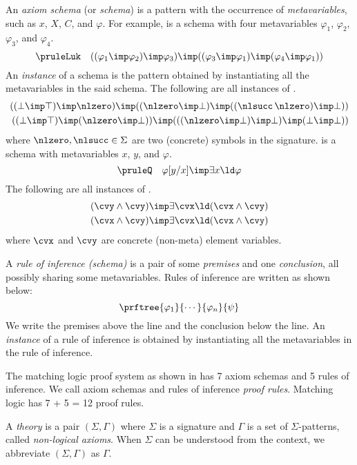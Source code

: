\documentclass{article}
\begin{document}
An \emph{axiom schema} (or \emph{schema}) is
a pattern with the occurrence of \emph{metavariables}, such as $x$, $X$, $C$, and $\varphi$.
For example,
\pruleLuk
is a schema with four metavariables
$\varphi_1$, $\varphi_2$, $\varphi_3$, and $\varphi_4$.
\[
\pruleLuk
\quad
((\varphi_1 \imp \varphi_2) \imp \varphi_3)
   \imp ((\varphi_3 \imp \varphi_1) \imp (\varphi_4 \imp \varphi_1))
\]
An \emph{instance} of a schema is the pattern obtained by
instantiating all the metavariables in the said schema.
The following are all instances of \pruleLuk.
\begin{align*}
((\bot \imp \top) \imp \nlzero)
   \imp ((\nlzero \imp \bot) \imp ((\nlsucc \, \nlzero) \imp \bot))
\\
((\bot \imp \top) \imp (\nlzero \imp \bot))
   \imp (((\nlzero \imp \bot) \imp \bot) \imp (\bot \imp \bot))
\end{align*}
where $\nlzero,\nlsucc \in \Sigma$ are two (concrete) symbols in the signature.
\pruleQ is a schema with metavariables $x$, $y$, and $\varphi$.
\[
\pruleQ \quad \varphi[y/x] \imp \exists x \ld \varphi
\]
The following are all instances of \pruleQ.
\begin{align*}
(\cvy \land \cvy) \imp \exists \cvx \ld (\cvx \land \cvy)
\\
(\cvx \land \cvy) \imp \exists \cvx \ld (\cvx \land \cvy)
\end{align*}
where $\cvx$ and $\cvy$ are concrete (non-meta) element variables.

A \emph{rule of inference (schema)} is a pair of
some \emph{premises} and one \emph{conclusion},
all possibly sharing some metavariables.
Rules of inference are written as shown below:
\[
\prftree{\varphi_1}{\cdots}{\varphi_n}{\psi}
\]
We write the premises above the line and the conclusion below the line.
An \emph{instance} of a rule of inference is obtained by
instantiating all the metavariables in the rule of inference.

The matching logic proof system as shown in 
has 7 axiom schemas and 5 rules of inference.
We call axiom schemas and rules of inference \emph{proof rules}.
Matching logic has 7 + 5 = 12 proof rules.

\begin{definition}
A \emph{theory} is a pair $(\Sigma,\Gamma)$
where $\Sigma$ is a signature and $\Gamma$ is a set of $\Sigma$-patterns,
called \emph{non-logical axioms}.
When $\Sigma$ can be understood from the context,
we abbreviate $(\Sigma, \Gamma)$ as $\Gamma$.
\end{definition}
\end{document}
